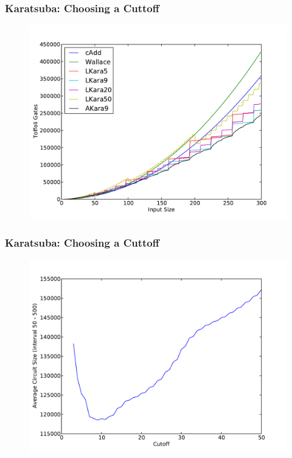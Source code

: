 \documentclass[utf8]{beamer}
\begin{document}
\begin{frame}
  \frametitle{Karatsuba: Choosing a Cuttoff}
  \begin{figure} 
    \includegraphics[width=\linewidth]{diagrams/karaCutt}
  \end{figure}
\end{frame}

\begin{frame}
  \frametitle{Karatsuba: Choosing a Cuttoff}
  \begin{figure} 
    \includegraphics[width=\linewidth]{diagrams/avgSizeCutt}
  \end{figure}
\end{frame}
\end{document}
